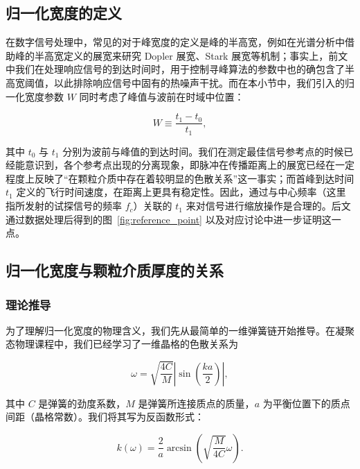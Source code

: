 \subsection{归一化宽度的定义}

在数字信号处理中，常见的对于峰宽度的定义是峰的半高宽，例如在光谱分析中借助峰的半高宽定义的展宽来研究 Dopler 展宽、Stark 展宽等机制；事实上，前文中我们在处理响应信号的到达时间时，用于控制寻峰算法的参数中也的确包含了半高宽阈值，以此排除响应信号中固有的热噪声干扰。而在本小节中，我们引入的归一化宽度参数 $W$ 同时考虑了峰值与波前在时域中位置：

\begin{equation}
  W \equiv \frac{t_{1}-t_{0}}{t_{1}},
\end{equation}

其中 $t_{0}$ 与 $t_{1}$ 分别为波前与峰值的到达时间。我们在测定最佳信号参考点的时候已经能意识到，各个参考点出现的分离现象，即脉冲在传播距离上的展宽已经在一定程度上反映了“在颗粒介质中存在着较明显的色散关系”这一事实；而首峰到达时间 $t_{1}$ 定义的飞行时间速度，在距离上更具有稳定性。因此，通过与中心频率（这里指所发射的试探信号的频率 $f_{c}$）关联的 $t_{1}$ 来对信号进行缩放操作是合理的。后文通过数据处理后得到的图~\ref{fig:reference_point} 以及对应讨论中进一步证明这一点。

\subsection{归一化宽度与颗粒介质厚度的关系}

\subsubsection{理论推导}

为了理解归一化宽度的物理含义，我们先从最简单的一维弹簧链开始推导。在凝聚态物理课程中，我们已经学习了一维晶格的色散关系为


\begin{equation}
  \omega=\sqrt{\frac{4C}{M}}\left|\sin\left(\frac{ka}{2}\right)\right|,
\end{equation}

其中 $C$ 是弹簧的劲度系数，$M$ 是弹簧所连接质点的质量，$a$ 为平衡位置下的质点间距（晶格常数）。我们将其写为反函数形式：

\begin{equation}
  k(\omega) = \frac{2}{a}\arcsin{\left(\sqrt{\frac{M}{4C}}\omega\right)}.\label{eq:1D_dispersion_relation}
\end{equation}

